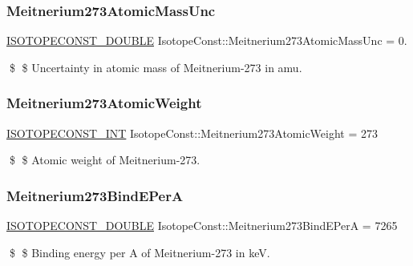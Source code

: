 \subsubsection{\texorpdfstring{Meitnerium273\+Atomic\+Mass\+Unc}{Meitnerium273AtomicMassUnc}}
{\footnotesize\ttfamily \mbox{\hyperlink{group___isotope_const-_macros_ga8f45a7272ce02c0b4c65c44636ed719a}{I\+S\+O\+T\+O\+P\+E\+C\+O\+N\+S\+T\+\_\+\+D\+O\+U\+B\+LE}} Isotope\+Const\+::\+Meitnerium273\+Atomic\+Mass\+Unc = 0.}

\$ \$ Uncertainty in atomic mass of Meitnerium-\/273 in amu. \mbox{\label{group___isotope_const-_meitnerium-_mt273_gabcf0095846e27501d31c9f65f8eeb3aa}} 
\subsubsection{\texorpdfstring{Meitnerium273\+Atomic\+Weight}{Meitnerium273AtomicWeight}}
{\footnotesize\ttfamily \mbox{\hyperlink{group___isotope_const-_macros_ga5f18360b3e99483a35c32d789e62621c}{I\+S\+O\+T\+O\+P\+E\+C\+O\+N\+S\+T\+\_\+\+I\+NT}} Isotope\+Const\+::\+Meitnerium273\+Atomic\+Weight = 273}

\$ \$ Atomic weight of Meitnerium-\/273. \mbox{\label{group___isotope_const-_meitnerium-_mt273_gaf07b9c5526109ce1093b16d0dff30464}} 
\subsubsection{\texorpdfstring{Meitnerium273\+Bind\+E\+PerA}{Meitnerium273BindEPerA}}
{\footnotesize\ttfamily \mbox{\hyperlink{group___isotope_const-_macros_ga8f45a7272ce02c0b4c65c44636ed719a}{I\+S\+O\+T\+O\+P\+E\+C\+O\+N\+S\+T\+\_\+\+D\+O\+U\+B\+LE}} Isotope\+Const\+::\+Meitnerium273\+Bind\+E\+PerA = 7265}

\$ \$ Binding energy per A of Meitnerium-\/273 in keV. \mbox{\label{group___isotope_const-_meitnerium-_mt273_ga0f9286bc86d226c01c45ec8ec3e82a88}} 
